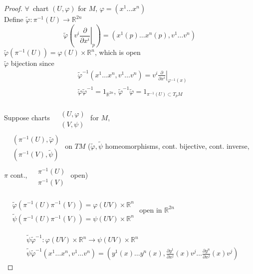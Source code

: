\documentclass[11pt]{amsart}
\theoremstyle{definition}
\begin{document}
\begin{proof}
$\forall \, $ chart $(U, \varphi) $ for $M$, $\varphi = (x^1 \dots x^n)$  \\
Define $\widetilde{\varphi} : \pi^{-1}(U) \to \mathbb{R}^{2n}$
\[
\widetilde{\varphi}\left( v^i \left. \frac{ \partial }{ \partial x^i } \right|_p \right) = (x^1(p) \dots x^n(p), v^1 \dots v^n)
\]
$\widetilde{\varphi}(\pi^{-1}(U)) = \varphi(U) \times \mathbb{R}^n$, which is open \\
$\widetilde{\varphi}$ bijection since
\[
\begin{aligned}
  & \widetilde{\varphi}^{-1}(x^1 \dots x^n, v^1 \dots v^n) = v^i \left. \frac{ \partial }{ \partial x^i} \right|_{\varphi^{-1}(x)} \\
  & \widetilde{\varphi} \widetilde{\varphi}^{-1} = 1_{\mathbb{R}^{2n}}, \, \widetilde{\varphi}^{-1} \widetilde{\varphi} = 1_{ \pi^{-1}(U) \subset T_pM }
\end{aligned}
\]

Suppose charts $\begin{aligned} & \quad \\
  & (U, \varphi) \\
  & (V, \psi ) \end{aligned}$ for $M$, \\
$\begin{aligned} & \quad \\
  & (\pi^{-1}(U), \widetilde{\varphi}) \\
  & ( \pi^{-1}(V), \widetilde{\psi} ) \end{aligned}$ on $TM$ ($\widetilde{\varphi}, \widetilde{\psi}$ homeomorphisms, cont. bijective, cont. inverse, $\pi$ cont., $\begin{aligned} & \quad \\
  & \pi^{-1}(U) \\ & \pi^{-1}(V) \end{aligned}$ open)

$\begin{aligned} & \quad \\
  & \widetilde{\varphi}( \pi^{-1}(U) \pi^{-1}(V) ) = \varphi(UV) \times \mathbb{R}^n \\
  & \widetilde{\psi}(\pi^{-1}(U) \pi^{-1}(V)) =  \psi(UV)\times \mathbb{R}^n \end{aligned}$ open in $\mathbb{R}^{2n}$

\[
\begin{aligned}
  & \widetilde{\psi} \widetilde{\varphi}^{-1} : \varphi(UV) \times \mathbb{R}^n \to \psi(UV) \times \mathbb{R}^n \\
  & \widetilde{\psi} \widetilde{\varphi}^{-1}(x^1 \dots x^n, v^1 \dots v^n) = (y^1(x) \dots y^n(x), \frac{ \partial y^1}{ \partial x^j}(x) v^j \dots \frac{ \partial y^n}{ \partial x^j}(x) v^j )
\end{aligned}
\]


\end{proof}
\end{document}
